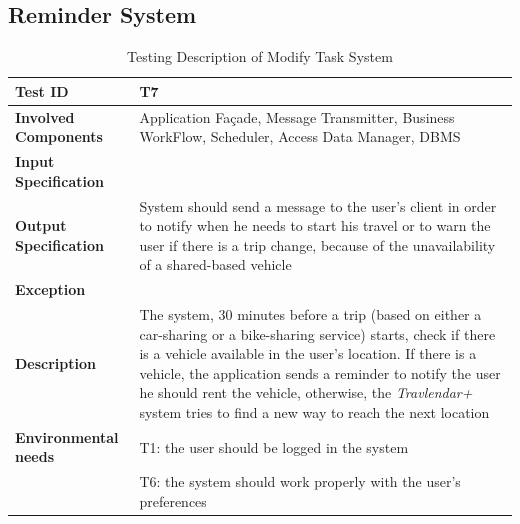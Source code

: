 \subsection*{Reminder System}

\begin{table}[H]
    \centering
    \begin{tabular}{p{4.55cm} p{7cm}}
        
        \hline
        
        \textbf{Test ID}                & T7 \\
        
        \hline
        
        \textbf{Involved Components}    & Application Façade, Message Transmitter, Business                                                            WorkFlow, Scheduler, Access Data Manager, DBMS\\
        
        \hline
        
        \textbf{Input Specification}    & \\
        
        \hline
        
        \textbf{Output Specification}   & System should send a message to the user's client in order to notify when he needs to start his travel or to warn the user if there is a trip change, because of the unavailability of a shared-based vehicle\\
        
        \hline
        
        \textbf{Exception}              & \\
        
        \hline
        
        \textbf{Description}            & The system, 30 minutes before a trip (based on either a car-sharing or a bike-sharing service) starts, check if there is a vehicle available in the user's location. If there is a vehicle, the application sends a reminder to notify the user he should rent the vehicle, otherwise, the \emph{Travlendar+} system tries to find a new way to reach the next location\\
        \hline
        
        \textbf{Environmental needs}    & T1: the user should be logged in the system\\
                                        & T6: the system should work properly with the user's preferences \\
        
        \hline
        
    \end{tabular}
    \caption{Testing Description of Modify Task System}
    
\end{table}




